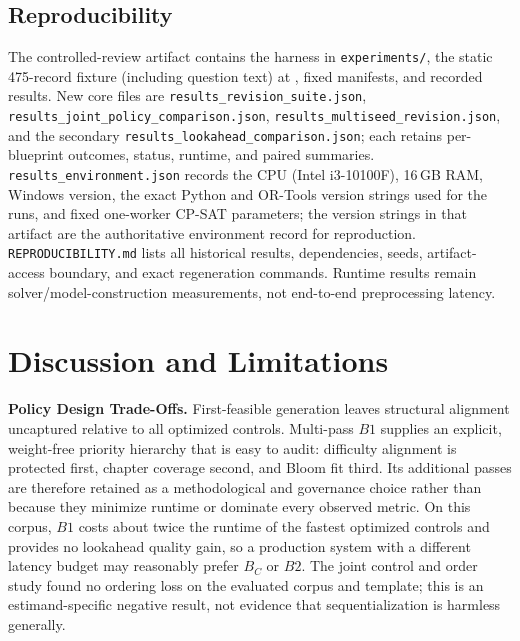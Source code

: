 \documentclass[runningheads]{llncs}
\begin{document}
\subsection{Reproducibility}
The controlled-review artifact contains the harness in \texttt{experiments/}, the static 475-record fixture (including question text) at , fixed manifests, and recorded results. New core files are \texttt{results\_revision\_suite.json}, \texttt{results\_joint\_policy\_comparison.json}, \texttt{results\_multiseed\_revision.json}, and the secondary \texttt{results\_lookahead\_comparison.json}; each retains per-blueprint outcomes, status, runtime, and paired summaries. \texttt{results\_environment.json} records the CPU (Intel i3-10100F), 16\,GB RAM, Windows version, the exact Python and OR-Tools version strings used for the runs, and fixed one-worker CP-SAT parameters; the version strings in that artifact are the authoritative environment record for reproduction. \texttt{REPRODUCIBILITY.md} lists all historical results, dependencies, seeds, artifact-access boundary, and exact regeneration commands. Runtime results remain solver/model-construction measurements, not end-to-end preprocessing latency.

\section{Discussion and Limitations}
\label{sec:discussion}

\noindent\textbf{Policy Design Trade-Offs.} First-feasible generation leaves structural alignment uncaptured relative to all optimized controls. Multi-pass $B1$ supplies an explicit, weight-free priority hierarchy that is easy to audit: difficulty alignment is protected first, chapter coverage second, and Bloom fit third. Its additional passes are therefore retained as a methodological and governance choice rather than because they minimize runtime or dominate every observed metric. On this corpus, $B1$ costs about twice the runtime of the fastest optimized controls and provides no lookahead quality gain, so a production system with a different latency budget may reasonably prefer $B_C$ or $B2$. The joint control and order study found no ordering loss on the evaluated corpus and template; this is an estimand-specific negative result, not evidence that sequentialization is harmless generally.
\end{document}
